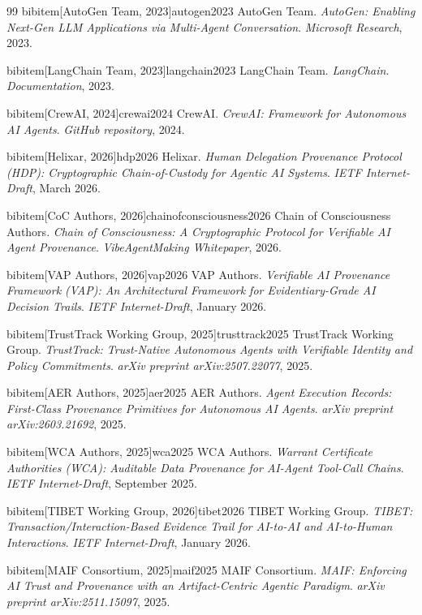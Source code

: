 \begin{thebibliography}{99}
bibitem[AutoGen Team, 2023]{autogen2023}
 AutoGen Team. \newblock \emph{AutoGen: Enabling Next-Gen LLM Applications via Multi-Agent Conversation}.
 \newblock \emph{Microsoft Research}, 2023.

bibitem[LangChain Team, 2023]{langchain2023}
 LangChain Team. \newblock \emph{LangChain}.
 \newblock \emph{Documentation}, 2023.

bibitem[CrewAI, 2024]{crewai2024}
 CrewAI. \newblock \emph{CrewAI: Framework for Autonomous AI Agents}.
 \newblock \emph{GitHub repository}, 2024.

bibitem[Helixar, 2026]{hdp2026}
 Helixar. \newblock \emph{Human Delegation Provenance Protocol (HDP): Cryptographic Chain-of-Custody for Agentic AI Systems}.
 \newblock \emph{IETF Internet-Draft}, March 2026.

bibitem[CoC Authors, 2026]{chainofconsciousness2026}
 Chain of Consciousness Authors. \newblock \emph{Chain of Consciousness: A Cryptographic Protocol for Verifiable AI Agent Provenance}.
 \newblock \emph{VibeAgentMaking Whitepaper}, 2026.

bibitem[VAP Authors, 2026]{vap2026}
 VAP Authors. \newblock \emph{Verifiable AI Provenance Framework (VAP): An Architectural Framework for Evidentiary-Grade AI Decision Trails}.
 \newblock \emph{IETF Internet-Draft}, January 2026.

bibitem[TrustTrack Working Group, 2025]{trusttrack2025}
 TrustTrack Working Group. \newblock \emph{TrustTrack: Trust-Native Autonomous Agents with Verifiable Identity and Policy Commitments}.
 \newblock \emph{arXiv preprint arXiv:2507.22077}, 2025.

bibitem[AER Authors, 2025]{aer2025}
 AER Authors. \newblock \emph{Agent Execution Records: First-Class Provenance Primitives for Autonomous AI Agents}.
 \newblock \emph{arXiv preprint arXiv:2603.21692}, 2025.

bibitem[WCA Authors, 2025]{wca2025}
 WCA Authors. \newblock \emph{Warrant Certificate Authorities (WCA): Auditable Data Provenance for AI-Agent Tool-Call Chains}.
 \newblock \emph{IETF Internet-Draft}, September 2025.

bibitem[TIBET Working Group, 2026]{tibet2026}
 TIBET Working Group. \newblock \emph{TIBET: Transaction/Interaction-Based Evidence Trail for AI-to-AI and AI-to-Human Interactions}.
 \newblock \emph{IETF Internet-Draft}, January 2026.

bibitem[MAIF Consortium, 2025]{maif2025}
 MAIF Consortium. \newblock \emph{MAIF: Enforcing AI Trust and Provenance with an Artifact-Centric Agentic Paradigm}.
 \newblock \emph{arXiv preprint arXiv:2511.15097}, 2025.


\end{thebibliography}
